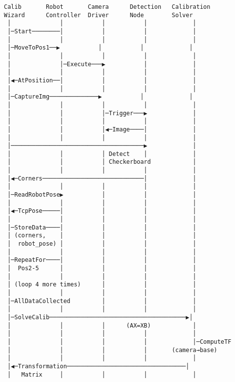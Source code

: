 \documentclass[
]{article}
\begin{document}
\begin{verbatim}
Calib       Robot       Camera      Detection   Calibration
Wizard      Controller  Driver      Node        Solver
 │              │           │           │             │
 │─Start────────│           │           │             │
 │              │           │           │             │
 │─MoveToPos1──▶           │           │             │
 │              │           │           │             │
 │              │─Execute───▶           │             │
 │              │           │           │             │
 │◀─AtPosition──│           │           │             │
 │              │           │           │             │
 │─CaptureImg──────────────▶           │             │
 │              │           │           │             │
 │              │           │─Trigger───▶             │
 │              │           │           │             │
 │              │           │◀─Image────│             │
 │              │           │           │             │
 │──────────────────────────────────────▶             │
 │              │           │ Detect    │             │
 │              │           │ Checkerboard            │
 │              │           │           │             │
 │◀─Corners─────────────────────────────│             │
 │              │           │           │             │
 │─ReadRobotPose▶           │           │             │
 │              │           │           │             │
 │◀─TcpPose─────│           │           │             │
 │              │           │           │             │
 │─StoreData────│           │           │             │
 │ (corners,    │           │           │             │
 │  robot_pose) │           │           │             │
 │              │           │           │             │
 │─RepeatFor────│           │           │             │
 │  Pos2-5      │           │           │             │
 │              │           │           │             │
 │ (loop 4 more times)      │           │             │
 │              │           │           │             │
 │─AllDataCollected         │           │             │
 │              │           │           │             │
 │─SolveCalib───────────────────────────────────────▶│
 │              │           │      (AX=XB)            │
 │              │           │           │             │
 │              │           │           │             │─ComputeTF
 │              │           │           │       (camera→base)
 │              │           │           │             │
 │◀─Transformation──────────────────────────────────│
 │   Matrix     │           │           │             │

\end{verbatim}
\end{document}
